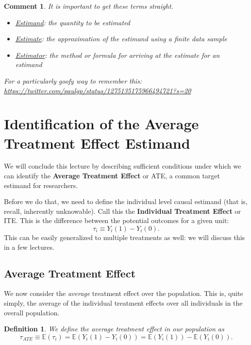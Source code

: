\documentclass{tufte-handout}
\theoremstyle{break}
\newtheorem{defN}{Definition}
\newtheorem{cmt}{Comment}
\newcommand{\E}{\mathbb{E}}
\begin{document}
\begin{boxF}
  \begin{cmt}
    It is important to get these terms straight. 
    \begin{itemize}
  \item \underline{Estimand}: the quantity to be estimated
  \item \underline{Estimate}: the approximation of the estimand using a finite data sample
  \item \underline{Estimator}: the method or formula for arriving at the estimate for an estimand
    \end{itemize}
    For a particularly goofy way to remember this: \url{https://twitter.com/paulgp/status/1275135175966494721?s=20}
    \end{cmt}
  \end{boxF}

\section{Identification of the Average Treatment Effect Estimand}
We will conclude this lecture by describing sufficient conditions under which we can identify the \textbf{Average Treatment Effect} or ATE, a common target estimand for researchers. 

Before we do that, we need to define the individual level causal estimand (that is, recall, inherently unknowable). Call this the \textbf{Individual Treatment Effect} or ITE. This is the difference between the potential outcomes for a given unit:
\begin{equation}
  \tau_{i} \equiv Y_{i}(1) - Y_{i}(0). 
\end{equation}
This can be easily generalized to multiple treatments as well: we will discuss this in a few lectures.

\subsection{Average Treatment Effect}
We now consider the \emph{average} treatment effect over the population. This is, quite simply, the average of the individual treatment effects over all individuals in the overall population.
\begin{defN}
  We define the average treatment effect in our population as 
  \begin{equation*}
    \tau_{ATE} \equiv \E(\tau_{i}) = \E(Y_{i}(1) - Y_{i}(0)) = \E(Y_{i}(1)) - \E(Y_{i}(0)).
  \end{equation*}
\end{defN}
\end{document}
